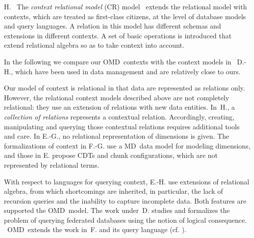 \documentclass[format=acmsmall, review=false, screen=true]{acmart}
\newcommand{\ignore}[1]{}
\newcommand{\omd}{OMD}
\newcommand{\md}{MD}
\begin{document}
\noindent H. \ The {\em context relational model} (CR) model~\citep{rousoss} extends the relational model with contexts, which are treated as first-class citizens, at the level of database models and query languages. A relation in this model has different schemas and extensions in different contexts. \ignore{An attribute may not exist under some contexts or that the attribute may have different values under different contexts.} A set of basic operations is introduced that extend relational algebra so as to take context into account.



\vspace{2mm}
In the following we compare our  \omd \ contexts with the context models in~ D.-H., which have been used in data management and are relatively close to ours.

Our model of context is relational in that  data are represented as relations only. However, the relational context models described above are not completely relational: they use an extension of relations with new data entities. In~H., a {\em collection of relations} represents a contextual relation. Accordingly, creating, manipulating and querying those contextual relations requires additional tools and care. In E.-G., no relational representation of dimensions is given. The formalizations of context in F.-G. use a \md \ data model for modeling dimensions, and those in E. propose CDTs and chunk configurations, which are not represented by relational terms.

 With respect to languages for querying context, E.-H. use extensions of relational algebra, from which shortcomings are inherited, in particular, the lack of recursion queries and the inability  to capture incomplete data. Both features are  supported the \omd \ model. The work under~D. studies and formalizes the problem of querying federated databases using the notion of logical consequence. \ \omd \ extends the work in~F. and its query language (cf. \cite[chap. 4]{milaniThesis}).
\end{document}
